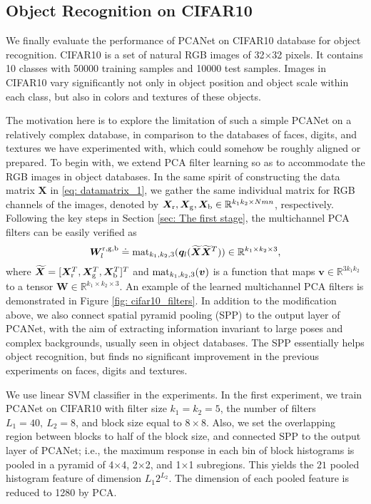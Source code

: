 \documentclass[10pt,journal,compsoc]{IEEEtran}
\begin{document}
\subsection{Object Recognition on CIFAR10}
We finally evaluate the performance of PCANet on CIFAR10 database for object recognition. CIFAR10 is a set of natural RGB images of 32$\times$32 pixels. It contains 10 classes with 50000 training samples and 10000 test samples. Images in CIFAR10 vary significantly not only in object position and object scale within each class, but also in colors and textures of these objects.

The motivation here is to explore the limitation of such a simple PCANet on a relatively complex database, in comparison to the databases of faces, digits, and textures we have experimented with, which could somehow be roughly aligned or prepared. To begin with, we extend PCA filter learning so as to accommodate the RGB images in object databases. In the same spirit of constructing the data matrix $\bm{X}$ in \eqref{eq: datamatrix_1}, we gather the same individual matrix for RGB channels of the images, denoted by $\bm{X}_{\rm r}, \bm{X}_{\rm g}, \bm{X}_{\rm b} \in \mathbb{R}^{k_1k_2 \times Nmn}$, respectively. Following the key steps in Section \ref{sec: The first stage}, the multichannel PCA filters can be easily verified as
\begin{equation}\label{eq: multichannel_PCAfilter1}
\bm{W}^{\rm r,g,b}_l \doteq {\rm mat}_{k_1,k_2,3}(\bm{ q}_l(\widetilde{\bm{X}}\widetilde{\bm{X}}^T))\in\mathbb{R}^{k_1 \times k_2 \times 3},
\end{equation}where $\widetilde{\bm{X}} = [\bm{X}_{\rm r}^T, \bm{X}_{\rm g}^T, \bm{X}_{\rm b}^T]^T$ and ${\rm mat}_{k_1,k_2,3}(\bm{ v})$ is a function that maps $\bm{ v}\in \mathbb{R}^{3k_1k_2 }$ to a tensor $\bm{ W}\in \mathbb{R}^{k_1 \times k_2 \times 3}$. An example of the learned multichannel PCA filters is demonstrated in Figure \ref{fig: cifar10_filters}. In addition to the modification above, we also connect spatial pyramid pooling (SPP) \cite{Grauman2005, Lazebnik2006, He2014} to the output layer of PCANet, with the aim of extracting information invariant to large poses and complex backgrounds, usually seen in object databases. The SPP essentially helps object recognition, but finds no significant improvement in the previous experiments on faces, digits and textures.

We use linear SVM classifier in the experiments. In the first experiment, we train PCANet on CIFAR10 with filter size $k_1 = k_2 = 5$, the number of filters $L_1 = 40,~L_2 = 8$, and block size equal to $8\times 8$. Also, we set the overlapping region between blocks to half of the block size, and connected SPP to the output layer of PCANet; i.e., the maximum response in each bin of block histograms is pooled in a pyramid of 4$\times$4, 2$\times$2, and 1$\times$1 subregions. This yields the $21$ pooled histogram feature of dimension $L_1 2^{L_2}$. The dimension of each pooled feature is reduced to 1280 by PCA.
\end{document}
